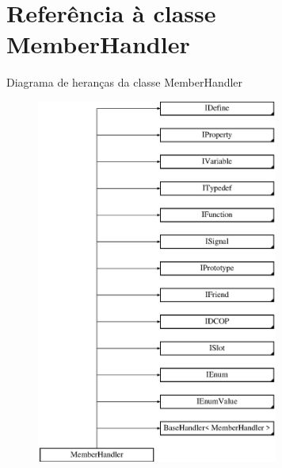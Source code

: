 \hypertarget{class_member_handler}{\section{Referência à classe Member\-Handler}
\label{class_member_handler}
}
Diagrama de heranças da classe Member\-Handler\begin{figure}[H]
\begin{center}
\leavevmode
\includegraphics[height=12.000000cm]{class_member_handler}
\end{center}
\end{figure}
